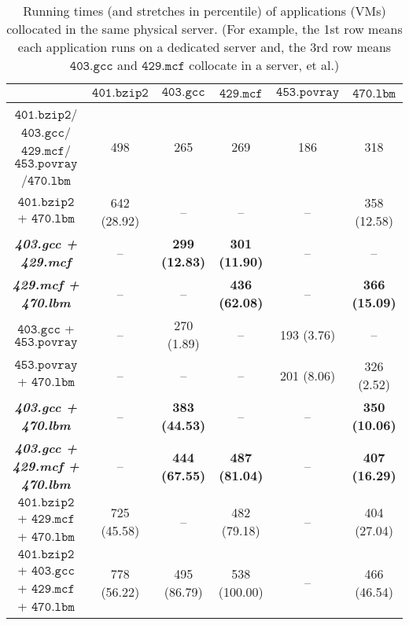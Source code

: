 \documentclass[10pt,journal]{IEEEtran}
\begin{document}
\renewcommand{\arraystretch}{1.3}
\begin{table*}[htbp]
\centering
\caption{\label{tb:spatial}Running times (and stretches in percentile) of applications (VMs) collocated in the same physical server. (For example, the 1st row means each application runs on a dedicated server and, the 3rd row means $\mathtt{403.gcc}$ and $\mathtt{429.mcf}$ collocate in a server, et al.)}
\begin{tabular}{c|c|c|c|c|c}\hline\hline
&$\mathtt{401.bzip2}$&$\mathtt{403.gcc}$&$\mathtt{429.mcf}$&$\mathtt{453.povray}$&$\mathtt{470.lbm}$\\\hline
$\mathtt{401.bzip2}$/$\mathtt{403.gcc}$/$\mathtt{429.mcf}$/$\mathtt{453.povray}$/$\mathtt{470.lbm}$&498&265&269&186&318\\\hline
$\mathtt{401.bzip2}$ + $\mathtt{470.lbm}$&642 (28.92)&--&--&--&358 (12.58)\\
\textbf{\textit{403.gcc + 429.mcf}}&--&{\bf 299 (12.83)}&{\bf 301 (11.90)}&--&--\\
\textbf{\textit{429.mcf + 470.lbm}}&--&--&{\bf 436 (62.08)}&--&{\bf 366 (15.09)}\\
$\mathtt{403.gcc}$ + $\mathtt{453.povray}$&--&270 (1.89)&--&193 (3.76)&--\\
$\mathtt{453.povray}$ + $\mathtt{470.lbm}$&--&--&--&201 (8.06)&326 (2.52)\\
\textbf{\textit{403.gcc + 470.lbm}}&--&{\bf 383 (44.53)}&--&--&{\bf 350 (10.06)}\\\hline
\textbf{\textit{403.gcc + 429.mcf + 470.lbm}}&--&{\bf 444 (67.55)}&{\bf 487 (81.04)}&--&{\bf 407 (16.29)}\\
$\mathtt{401.bzip2}$ + $\mathtt{429.mcf}$ + $\mathtt{470.lbm}$&725 (45.58)&--&482 (79.18)&--&404 (27.04)\\
$\mathtt{401.bzip2}$ + $\mathtt{403.gcc}$ + $\mathtt{429.mcf}$ + $\mathtt{470.lbm}$&778 (56.22)&495 (86.79)&538 (100.00)&--&466 (46.54)\\\hline\hline
\end{tabular}
\end{table*}
\end{document}
